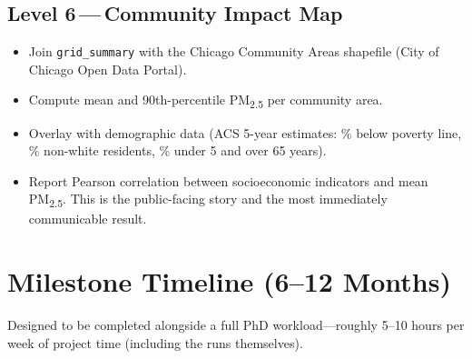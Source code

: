 \documentclass[11pt, letterpaper]{article}
\begin{document}
\subsection{Level 6\,---\,Community Impact Map}
\begin{itemize}
  \item Join \texttt{grid\_summary} with the Chicago Community Areas shapefile (City of Chicago Open Data Portal).
  \item Compute mean and 90th-percentile PM\textsubscript{2.5} per community area.
  \item Overlay with demographic data (ACS 5-year estimates: \% below poverty line, \% non-white residents, \% under 5 and over 65 years).
  \item Report Pearson correlation between socioeconomic indicators and mean PM\textsubscript{2.5}. This is the public-facing story and the most immediately communicable result.
\end{itemize}

\newpage

\section{Milestone Timeline (6--12 Months)}

Designed to be completed alongside a full PhD workload---roughly 5--10 hours per week of
project time (including the runs themselves).
\end{document}
